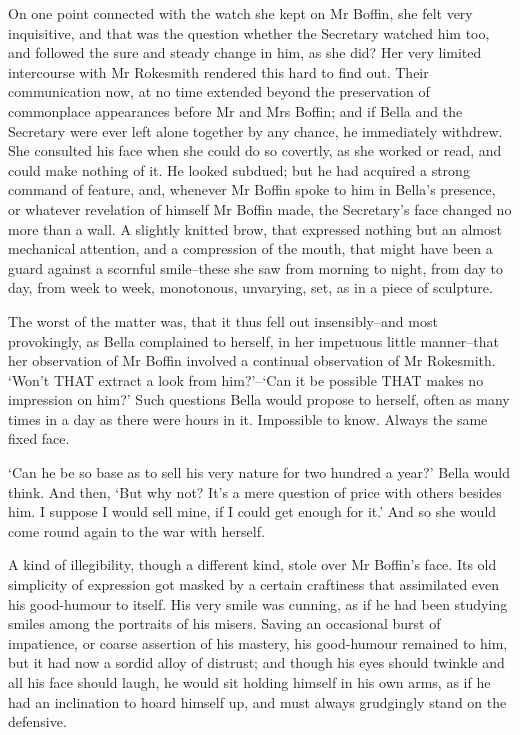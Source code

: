On one point connected with the watch she kept on Mr Boffin, she felt
very inquisitive, and that was the question whether the Secretary
watched him too, and followed the sure and steady change in him, as she
did? Her very limited intercourse with Mr Rokesmith rendered this hard
to find out. Their communication now, at no time extended beyond the
preservation of commonplace appearances before Mr and Mrs Boffin; and if
Bella and the Secretary were ever left alone together by any chance,
he immediately withdrew. She consulted his face when she could do so
covertly, as she worked or read, and could make nothing of it. He looked
subdued; but he had acquired a strong command of feature, and, whenever
Mr Boffin spoke to him in Bella’s presence, or whatever revelation of
himself Mr Boffin made, the Secretary’s face changed no more than a
wall. A slightly knitted brow, that expressed nothing but an almost
mechanical attention, and a compression of the mouth, that might have
been a guard against a scornful smile--these she saw from morning to
night, from day to day, from week to week, monotonous, unvarying, set,
as in a piece of sculpture.

The worst of the matter was, that it thus fell out insensibly--and most
provokingly, as Bella complained to herself, in her impetuous little
manner--that her observation of Mr Boffin involved a continual
observation of Mr Rokesmith. ‘Won’t THAT extract a look from him?’--‘Can
it be possible THAT makes no impression on him?’ Such questions Bella
would propose to herself, often as many times in a day as there were
hours in it. Impossible to know. Always the same fixed face.

‘Can he be so base as to sell his very nature for two hundred a year?’
Bella would think. And then, ‘But why not? It’s a mere question of price
with others besides him. I suppose I would sell mine, if I could get
enough for it.’ And so she would come round again to the war with
herself.

A kind of illegibility, though a different kind, stole over Mr
Boffin’s face. Its old simplicity of expression got masked by a certain
craftiness that assimilated even his good-humour to itself. His very
smile was cunning, as if he had been studying smiles among the portraits
of his misers. Saving an occasional burst of impatience, or coarse
assertion of his mastery, his good-humour remained to him, but it had
now a sordid alloy of distrust; and though his eyes should twinkle and
all his face should laugh, he would sit holding himself in his own
arms, as if he had an inclination to hoard himself up, and must always
grudgingly stand on the defensive.

